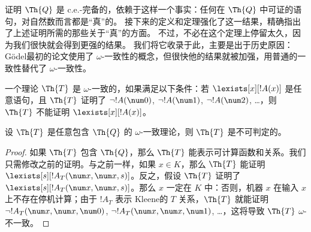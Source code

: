 \documentclass[../../../include/open-logic-section]{subfiles}
\begin{document}


\begin{explain}
证明 $\Th{Q}$ 是 c.e.-完备的，依赖于这样一个事实：任何在 $\Th{Q}$ 中可证的语句，对自然数而言都是“真”的。
接下来的定义和定理强化了这一结果，精确指出了上述证明所需的那些关于“真”的方面。
不过，不必在这个定理上停留太久，因为我们很快就会得到更强的结果。
我们将它收录于此，主要是出于历史原因：Gödel最初的论文使用了 $\omega$-一致性的概念，但很快他的结果就被加强，用普通的一致性替代了 $\omega$-一致性。
\end{explain}

\begin{defn}
一个理论 $\Th{T}$ 是 $\omega$-一致的，如果满足以下条件：若 $\lexists[x][!A(x)]$ 是任意语句，且 $\Th{T}$ 证明了 $\lnot !A(\num 0)$, $\lnot !A(\num 1)$, $\lnot !A(\num 2)$, \dots，则 $\Th{T}$ 不能证明 $\lexists[x][!A(x)]$。
\end{defn}

\begin{thm}
  设 $\Th{T}$ 是任意包含 $\Th{Q}$ 的 $\omega$-一致理论，则 $\Th{T}$ 是不可判定的。
\end{thm}

\begin{proof}
如果 $\Th{T}$ 包含 $\Th{Q}$，那么 $\Th{T}$ 能表示可计算函数和关系。我们只需修改之前的证明。与之前一样，如果 $x \in K$，那么 $\Th{T}$ 能证明 $\lexists[s][!A_T(\num
  x,\num x, s)]$。反之，假设 $\Th{T}$ 证明了 $\lexists[s][!A_T(\num x, \num x, s)]$。那么 $x$ 一定在 $K$ 中：否则，机器 $x$ 在输入 $x$ 上不存在停机计算；由于 $!A_T$ 表示 Kleene的 $T$ 关系，$\Th{T}$ 就能证明 $\lnot !A_T(\num x, \num x, \num 0)$, $\lnot !A_T(\num x, \num
x, \num 1)$, \dots，这将导致 $\Th{T}$ $\omega$-不一致。
\end{proof}
\end{document}
